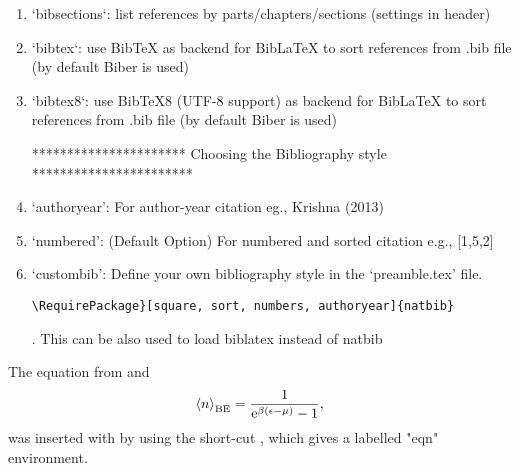 \begin{enumerate}
\item`bibsections`: list references by parts/chapters/sections (settings in header)

\item`bibtex`: use BibTeX as backend for BibLaTeX to sort references from .bib file (by default Biber is used)

\item`bibtex8`: use BibTeX8 (UTF-8 support) as backend for BibLaTeX to sort references from .bib file (by default Biber is used)

 ********************** Choosing the Bibliography style ***********************
\item`authoryear': For author-year citation eg., Krishna (2013)

\item`numbered': (Default Option) For numbered and sorted citation e.g., [1,5,2]

\item`custombib': Define your own bibliography style in the `preamble.tex' file.
              \begin{verbatim}\RequirePackage}[square, sort, numbers, authoryear]{natbib} \end{verbatim}.
              This can be also used to load biblatex instead of natbib
              
\end{enumerate}



The equation from \autocite{Einstein1924, Einstein1925} and \autocite{deBroglie1929}
\begin{equation}\label{eqn:bose_einstein_distribution}
	\left\langle n \right\rangle_\mathrm{BE}=\frac{1}{\mathrm{e}^{\beta \left( \epsilon - \mu \right) } - 1},
\end{equation}
was inserted with by using the short-cut , which gives a labelled "eqn" environment.